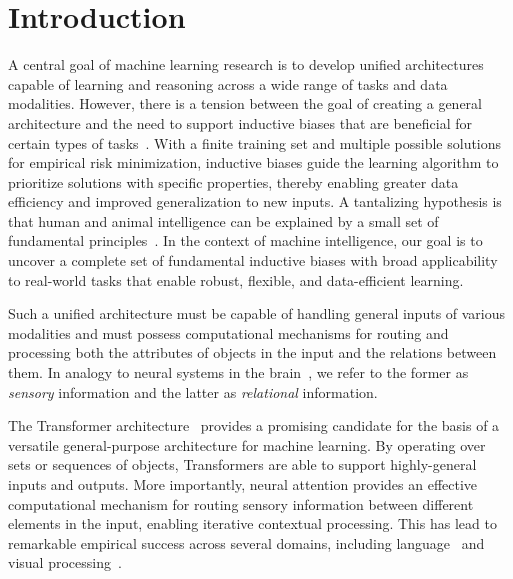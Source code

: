 \section{Introduction}\label{sec:intro}


A central goal of machine learning research is to develop unified architectures capable of learning and reasoning across a wide range of tasks and data modalities. However, there is a tension between the goal of creating a general architecture and the need to support inductive biases that are beneficial for certain types of tasks~\citep{wolpert1995no,baxter2000model}. With a finite training set and multiple possible solutions for empirical risk minimization, inductive biases guide the learning algorithm to prioritize solutions with specific properties, thereby enabling greater data efficiency and improved generalization to new inputs. A tantalizing hypothesis is that human and animal intelligence can be explained by a small set of fundamental principles~\citep{marcus2003algebraic}. In the context of machine intelligence, our goal is to uncover a complete set of fundamental inductive biases with broad applicability to real-world tasks that enable robust, flexible, and data-efficient learning.

Such a unified architecture must be capable of handling general inputs of various modalities and must possess computational mechanisms for routing and processing both the attributes of objects in the input and the relations between them. In analogy to neural systems in the brain~\citep{newman1997neural}, we refer to the former as \textit{sensory} information and the latter as \textit{relational} information.

The Transformer architecture~\citep{vaswani2017attention} provides a promising candidate for the basis of a versatile general-purpose architecture for machine learning. By operating over sets or sequences of objects, Transformers are able to support highly-general inputs and outputs. More importantly, neural attention provides an effective computational mechanism for routing sensory information between different elements in the input, enabling iterative contextual processing. This has lead to remarkable empirical success across several domains, including language~\citep{kaplan2020scalinglawsneurallanguage} and visual processing~\citep{dosovitskiyImageWorth16x162020}.

